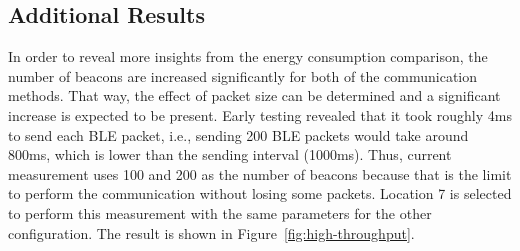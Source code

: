 \documentclass[journal]{vgtc}                %
\begin{document}


\subsection{Additional Results} %
\label{sub:additional_results}
In order to reveal more insights from the energy consumption comparison, the number of beacons are increased significantly for both of the communication methods. That way, the effect of packet size can be determined and a significant increase is expected to be present. Early testing revealed that it took roughly 4ms to send each BLE packet, i.e., sending 200 BLE packets would take around 800ms, which is lower than the sending interval (1000ms). Thus, current measurement uses 100 and 200 as the number of beacons because that is the limit to perform the communication without losing some packets.  Location 7 is selected to perform this measurement with the same parameters for the other configuration. The result is shown in Figure~\ref{fig:high-throughput}.
\end{document}
